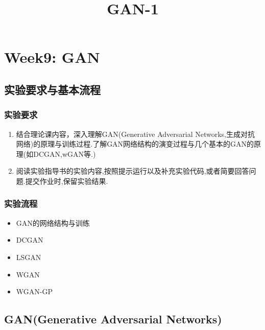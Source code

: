 \documentclass[11pt]{article}
\title{GAN-1}
\providecommand{\tightlist}{%
      \setlength{\itemsep}{0pt}\setlength{\parskip}{0pt}}
\begin{document}
    
    
    \maketitle
    
    

    
    \hypertarget{week9-gan}{%
\section{Week9: GAN}\label{week9-gan}}

    \hypertarget{ux5b9eux9a8cux8981ux6c42ux4e0eux57faux672cux6d41ux7a0b}{%
\subsection{实验要求与基本流程}\label{ux5b9eux9a8cux8981ux6c42ux4e0eux57faux672cux6d41ux7a0b}}

\hypertarget{ux5b9eux9a8cux8981ux6c42}{%
\subsubsection{实验要求}\label{ux5b9eux9a8cux8981ux6c42}}

\begin{enumerate}
\def\labelenumi{\arabic{enumi}.}
\tightlist
\item
  结合理论课内容，深入理解GAN(Generative Adversarial
  Networks,生成对抗网络)的原理与训练过程.了解GAN网络结构的演变过程与几个基本的GAN的原理(如DCGAN,wGAN等.)
\item
  阅读实验指导书的实验内容,按照提示运行以及补充实验代码,或者简要回答问题.提交作业时,保留实验结果.
\end{enumerate}

\hypertarget{ux5b9eux9a8cux6d41ux7a0b}{%
\subsubsection{实验流程}\label{ux5b9eux9a8cux6d41ux7a0b}}

\begin{itemize}
\tightlist
\item
  GAN的网络结构与训练
\item
  DCGAN
\item
  LSGAN
\item
  WGAN
\item
  WGAN-GP
\end{itemize}

    \hypertarget{gangenerative-adversarial-networks}{%
\subsection{GAN(Generative Adversarial
Networks)}\label{gangenerative-adversarial-networks}}
\end{document}
